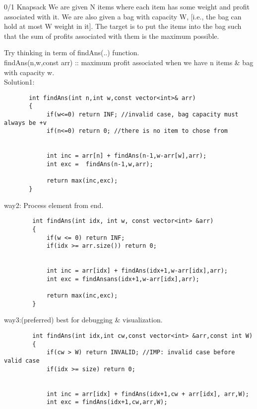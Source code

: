 \begin{problem}{0/1 Knapsack}
    We are given N items where each item has some weight and profit associated with it. We are also given a bag with capacity W, [i.e., the bag can hold at most W weight in it]. The target is to put the items into the bag such that the sum of profits associated with them is the maximum possible. 
\end{problem}

\begin{solution}
    Try thinking in term of findAns(..) function.\\

    findAns(n,w,const arr) :: maximum profit associated when we have n items \& bag with capacity w.\\
   
    Solution1:
    \begin{verbatim}
       int findAns(int n,int w,const vector<int>& arr)
       {
            if(w<=0) return INF; //invalid case, bag capacity must always be +v
            if(n<=0) return 0; //there is no item to chose from
           

            int inc = arr[n] + findAns(n-1,w-arr[w],arr);
            int exc =  findAns(n-1,w,arr);

            return max(inc,exc);
       }
    \end{verbatim}

way2: Process element from end.
    \begin{verbatim}
        int findAns(int idx, int w, const vector<int> &arr)
        {
            if(w <= 0) return INF;
            if(idx >= arr.size()) return 0;
            

            int inc = arr[idx] + findAns(idx+1,w-arr[idx],arr);
            int exc = findAnsans(idx+1,w-arr[idx],arr);
            
            return max(inc,exc);
        }
    \end{verbatim}

way3:(preferred) best for debugging \& visualization.

    \begin{verbatim}
        int findAns(int idx,int cw,const vector<int> &arr,const int W)
        {
            if(cw > W) return INVALID; //IMP: invalid case before valid case
            if(idx >= size) return 0;
           

            int inc = arr[idx] + findAns(idx+1,cw + arr[idx], arr,W);
            int exc = findAns(idx+1,cw,arr,W);


\end{verbatim}
\end{solution}
